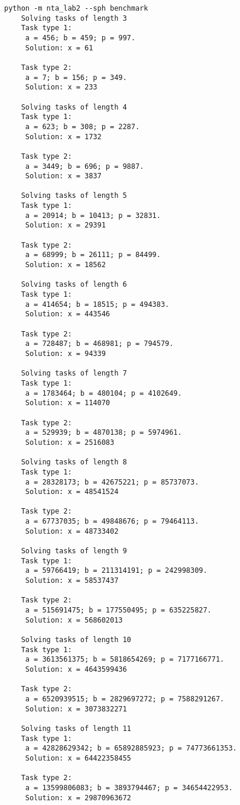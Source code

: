 \begin{lstlisting}
python -m nta_lab2 --sph benchmark
    Solving tasks of length 3
    Task type 1:
     a = 456; b = 459; p = 997.
     Solution: x = 61
    
    Task type 2:
     a = 7; b = 156; p = 349.
     Solution: x = 233
    
    Solving tasks of length 4
    Task type 1:
     a = 623; b = 308; p = 2287.
     Solution: x = 1732
    
    Task type 2:
     a = 3449; b = 696; p = 9887.
     Solution: x = 3837
    
    Solving tasks of length 5
    Task type 1:
     a = 20914; b = 10413; p = 32831.
     Solution: x = 29391
    
    Task type 2:
     a = 68999; b = 26111; p = 84499.
     Solution: x = 18562
    
    Solving tasks of length 6
    Task type 1:
     a = 414654; b = 18515; p = 494383.
     Solution: x = 443546
    
    Task type 2:
     a = 728487; b = 468981; p = 794579.
     Solution: x = 94339
    
    Solving tasks of length 7
    Task type 1:
     a = 1783464; b = 480104; p = 4102649.
     Solution: x = 114070
    
    Task type 2:
     a = 529939; b = 4870138; p = 5974961.
     Solution: x = 2516083
    
    Solving tasks of length 8
    Task type 1:
     a = 28328173; b = 42675221; p = 85737073.
     Solution: x = 48541524
    
    Task type 2:
     a = 67737035; b = 49848676; p = 79464113.
     Solution: x = 48733402
    
    Solving tasks of length 9
    Task type 1:
     a = 59766419; b = 211314191; p = 242998309.
     Solution: x = 58537437
    
    Task type 2:
     a = 515691475; b = 177550495; p = 635225827.
     Solution: x = 568602013
    
    Solving tasks of length 10
    Task type 1:
     a = 3613561375; b = 5818654269; p = 7177166771.
     Solution: x = 4643599436
    
    Task type 2:
     a = 6520939515; b = 2829697272; p = 7588291267.
     Solution: x = 3073832271
    
    Solving tasks of length 11
    Task type 1:
     a = 42828629342; b = 65892885923; p = 74773661353.
     Solution: x = 64422358455
    
    Task type 2:
     a = 13599806083; b = 3893794467; p = 34654422953.
     Solution: x = 29870963672
    

\end{lstlisting}

